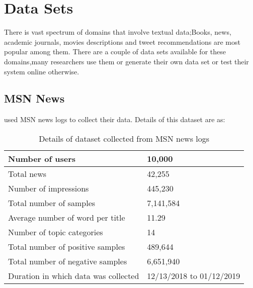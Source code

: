 \section{Data Sets}
There is vast spectrum of domains that involve textual data;Books, news, academic journals, movies descriptions and tweet recommendations are most popular among them. There are a couple of data sets available for these domains,many researchers use them or generate their own data set or test their system online otherwise.
\subsection{ MSN News}
\cite{N11}  used MSN news logs to collect their data. Details of this dataset are as:
\\
\begin{table}[!htbp] 
\centering
\footnotesize
\def\arraystretch{1.4}%
\centering
\begin{tabular}{|p{8cm}|p{2cm}|}
\hline
Number of users & 10,000
\\
\hline
Total news & 42,255
\\
\hline 
Number of impressions & 445,230
\\
\hline 
Total number of samples & 7,141,584
\\
\hline
Average number of word per title & 11.29
\\
\hline 
Number of topic categories & 14
\\
\hline 
Total number of positive samples & 489,644
\\
\hline 
Total number of negative samples & 6,651,940
\\
\hline 
Duration in which data was collected & 12/13/2018 to 01/12/2019
\\
\hline
\end{tabular}

\caption{Details of dataset collected from MSN news logs}
\label{table:18}
\end{table}
\\
